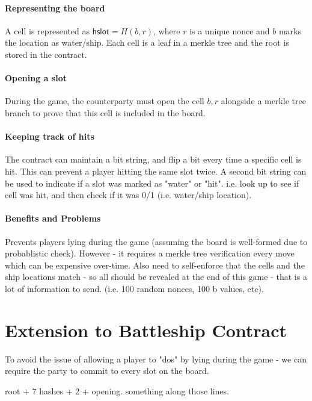 \documentclass{llncs}
\newcommand{\hslot}{\mathsf{hslot}}
\begin{document}
\paragraph{Representing the board}

A cell is represented as $\hslot = H(b, r)$, where  $r$ is a unique nonce and $b$ marks the location as water/ship. 
Each cell is a leaf in a merkle tree and the root is stored in the contract. 

\paragraph{Opening a slot} 

During the game, the counterparty must open the cell $b,r$ alongside a merkle tree branch to prove that this cell is included in the board. 

\paragraph{Keeping track of hits} The contract can maintain a bit string, and flip a bit every time a specific cell is hit. This can prevent a player hitting the same slot twice. A second bit string can be used to indicate if a slot was marked as "water" or "hit". i.e. look up to see if cell was hit, and then check if it was 0/1 (i.e. water/ship location). 

\paragraph{Benefits and Problems} Prevents players lying during the game (assuming the board is well-formed due to probablistic check). However - it requires a merkle tree verification every move which can be expensive over-time. Also need to self-enforce that the cells and the ship locations match - so all should be revealed at the end of this game - that is a lot of information to send. (i.e. 100 random nonces, 100 b values, etc). 


\section{Extension to Battleship Contract}

To avoid the issue of allowing a player to "dos" by lying during the game - we can require the party to commit to every slot on the board. 

root + 7 hashes + 2 + opening. something along those lines. 
\end{document}
